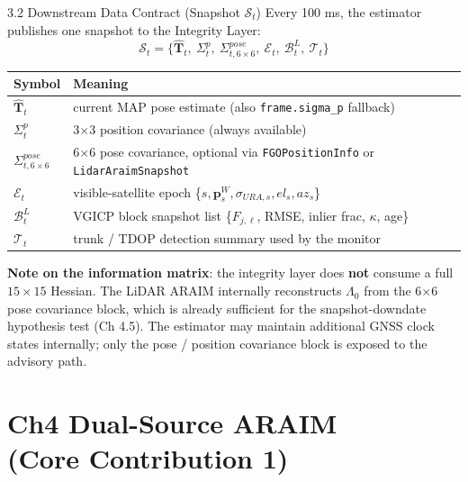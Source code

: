 \documentclass[10pt,aspectratio=169,xcolor=dvipsnames]{beamer}
\newcommand{\1}{\mathbb{1}}
\begin{document}
\begin{frame}{3.2 Downstream Data Contract (Snapshot \(\mathcal{S}_t\))}
  \small
  Every 100 ms, the estimator publishes one snapshot to the Integrity Layer:
  \[
    \mathcal{S}_t =
    \bigl\{\hat{\bm{T}}_t,\ \Sigma^{p}_{t},\ \Sigma^{pose}_{t,6\times 6},\
    \mathcal{E}_t,\ \mathcal{B}^L_t,\ \mathcal{T}_t\bigr\}
  \]

  \begin{table}
    \scriptsize
    \begin{tabular}{lp{}}
      \toprule
      \textbf{Symbol} & \textbf{Meaning}\\
      \midrule
      $\hat{\bm{T}}_t$ & current MAP pose estimate (also \texttt{frame.sigma\_p} fallback)\\
      $\Sigma^{p}_{t}$ & 3$\times$3 position covariance (always available)\\
      $\Sigma^{pose}_{t,6\times 6}$ & 6$\times$6 pose covariance, optional via \texttt{FGOPositionInfo} or \texttt{LidarAraimSnapshot}\\
      $\mathcal{E}_t$ & visible-satellite epoch \{$s, \bm{p}^W_s, \sigma_{URA,s}, el_s, az_s$\}\\
      $\mathcal{B}^L_t$ & VGICP block snapshot list \{$F_{j,\ell}$, RMSE, inlier frac, $\kappa$, age\}\\
      $\mathcal{T}_t$ & trunk / TDOP detection summary used by the monitor\\
      \bottomrule
    \end{tabular}
  \end{table}

  \vspace{6pt}
  \textbf{Note on the information matrix}: the integrity layer does \textbf{not} consume a full $15\!\times\!15$ Hessian. The LiDAR ARAIM internally reconstructs $\Lambda_0$ from the 6$\times$6 pose covariance block, which is already sufficient for the snapshot-downdate hypothesis test (Ch 4.5).
  The estimator may maintain additional GNSS clock states internally; only the pose / position covariance block is exposed to the advisory path.
\end{frame}

\section{Ch4 Dual-Source ARAIM \\(Core Contribution 1)}
\end{document}
